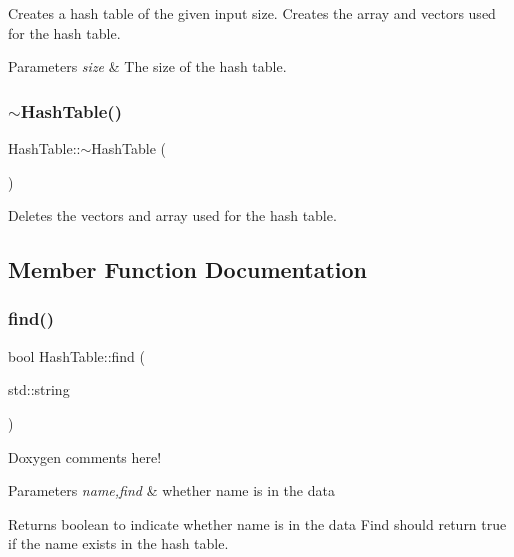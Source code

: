 Creates a hash table of the given input size. Creates the array and vectors used for the hash table.


\begin{DoxyParams}{Parameters}
{\em size} & The size of the hash table. \\
\hline
\end{DoxyParams}
\mbox{\label{class_hash_table_a9ce5569bb945880cacb29aaba6f3e3f9}} 
\subsubsection{\texorpdfstring{$\sim$\+Hash\+Table()}{~HashTable()}}
{\footnotesize\ttfamily Hash\+Table\+::$\sim$\+Hash\+Table (\begin{DoxyParamCaption}{ }\end{DoxyParamCaption})}

Deletes the vectors and array used for the hash table. 

\subsection{Member Function Documentation}
\mbox{\label{class_hash_table_aa53511e44d432ab84f2cb0c8cd9b4c5c}} 
\subsubsection{\texorpdfstring{find()}{find()}}
{\footnotesize\ttfamily bool Hash\+Table\+::find (\begin{DoxyParamCaption}\item[{std\+::string}]{ }\end{DoxyParamCaption})}

Doxygen comments here! 
\begin{DoxyParams}{Parameters}
{\em name,find} & whether name is in the data \\
\hline
\end{DoxyParams}
\begin{DoxyReturn}{Returns}
boolean to indicate whether name is in the data Find should return true if the name exists in the hash table. 
\end{DoxyReturn}
\mbox{\label{class_hash_table_aeedf096a6ec56507c0ff33fd945793ea}} 
